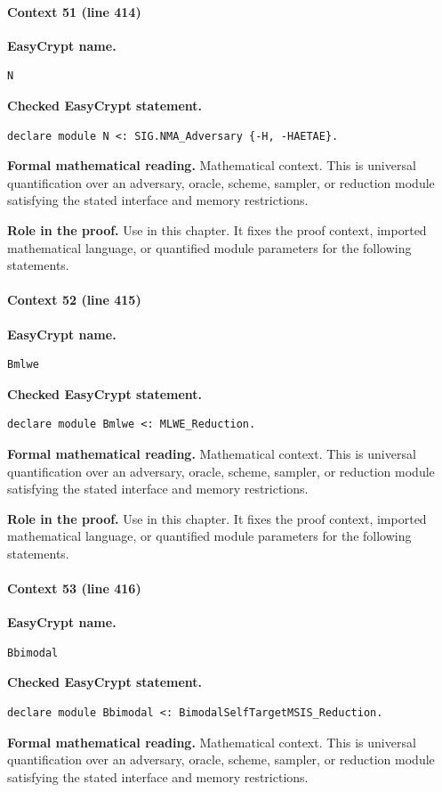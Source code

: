 \paragraph{Context 51 (line 414)}
\noindent\textbf{EasyCrypt name.}
\begin{lstlisting}[language=EasyCrypt,basicstyle=\ttfamily\scriptsize]
N
\end{lstlisting}
\noindent\textbf{Checked EasyCrypt statement.}
\begin{lstlisting}[language=EasyCrypt,basicstyle=\ttfamily\scriptsize]
declare module N <: SIG.NMA_Adversary {-H, -HAETAE}.
\end{lstlisting}
\noindent\textbf{Formal mathematical reading.}
Mathematical context. This is universal quantification over an adversary, oracle, scheme, sampler, or reduction module satisfying the stated interface and memory restrictions.

\noindent\textbf{Role in the proof.}
Use in this chapter. It fixes the proof context, imported mathematical language, or quantified module parameters for the following statements.

\paragraph{Context 52 (line 415)}
\noindent\textbf{EasyCrypt name.}
\begin{lstlisting}[language=EasyCrypt,basicstyle=\ttfamily\scriptsize]
Bmlwe
\end{lstlisting}
\noindent\textbf{Checked EasyCrypt statement.}
\begin{lstlisting}[language=EasyCrypt,basicstyle=\ttfamily\scriptsize]
declare module Bmlwe <: MLWE_Reduction.
\end{lstlisting}
\noindent\textbf{Formal mathematical reading.}
Mathematical context. This is universal quantification over an adversary, oracle, scheme, sampler, or reduction module satisfying the stated interface and memory restrictions.

\noindent\textbf{Role in the proof.}
Use in this chapter. It fixes the proof context, imported mathematical language, or quantified module parameters for the following statements.

\paragraph{Context 53 (line 416)}
\noindent\textbf{EasyCrypt name.}
\begin{lstlisting}[language=EasyCrypt,basicstyle=\ttfamily\scriptsize]
Bbimodal
\end{lstlisting}
\noindent\textbf{Checked EasyCrypt statement.}
\begin{lstlisting}[language=EasyCrypt,basicstyle=\ttfamily\scriptsize]
declare module Bbimodal <: BimodalSelfTargetMSIS_Reduction.
\end{lstlisting}
\noindent\textbf{Formal mathematical reading.}
Mathematical context. This is universal quantification over an adversary, oracle, scheme, sampler, or reduction module satisfying the stated interface and memory restrictions.

